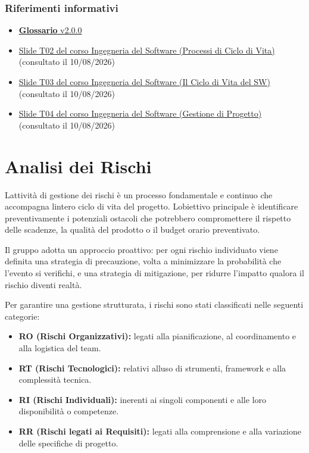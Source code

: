 \documentclass[12pt, a4paper]{article}
\begin{document}
\subsubsection{Riferimenti informativi}

\begin{itemize}
\item
  \href{https://skynetunigroup.github.io/Code_Guardian/Documentazione/PB/glossario_v2.0.0.pdf}{\textbf{Glossario} v2.0.0}
\item
  \href{https://www.math.unipd.it/~tullio/IS-1/2025/Dispense/T02.pdf}{Slide T02 del corso Ingegneria del Software (Processi di Ciclo di Vita)} (consultato il 10/08/2026)
\item
    \href{https://www.math.unipd.it/~tullio/IS-1/2025/Dispense/T03.pdf}{Slide T03 del corso Ingegneria del Software (Il Ciclo di Vita del SW)} (consultato il 10/08/2026)
\item
  \href{https://www.math.unipd.it/~tullio/IS-1/2025/Dispense/T04.pdf}{Slide T04 del corso Ingegneria del Software (Gestione di Progetto)} (consultato il 10/08/2026)

\end{itemize}

\newpage
\section{Analisi dei Rischi}

L\textquotesingle attività di gestione dei rischi è un processo
fondamentale e continuo che accompagna l\textquotesingle intero ciclo di
vita del progetto.
L\textquotesingle obiettivo principale è identificare
preventivamente i potenziali ostacoli che potrebbero compromettere il
rispetto delle scadenze, la qualità del prodotto o il budget orario
preventivato.

Il gruppo adotta un approccio proattivo: per ogni rischio individuato
viene definita una strategia di precauzione, volta a minimizzare la probabilità che l'evento si verifichi, e una strategia di mitigazione, per ridurre l'impatto qualora il rischio diventi realtà.

Per garantire una gestione strutturata, i rischi sono stati classificati
nelle seguenti categorie:

\begin{itemize}
\item
  \textbf{RO (Rischi Organizzativi):} legati alla pianificazione, al
  coordinamento e alla logistica del team.
\item
  \textbf{RT (Rischi Tecnologici):} relativi all\textquotesingle uso di
  strumenti, framework e alla complessità tecnica.
\item
  \textbf{RI (Rischi Individuali):} inerenti ai singoli componenti e
  alle loro disponibilità o competenze.
\item
  \textbf{RR (Rischi legati ai Requisiti):} legati alla comprensione e
  alla variazione delle specifiche di progetto.
\end{itemize}
\end{document}
